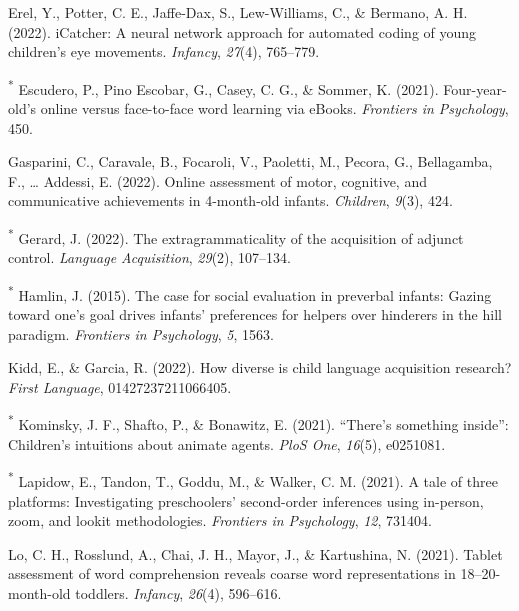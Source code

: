 \documentclass[
  man,floatsintext]{apa6}
\newlength{\cslhangindent}
\newlength{\cslentryspacingunit} %
\newenvironment{CSLReferences}[2] %
 {%
  \setlength{\parindent}{0pt}
  \ifodd #1
  \let\oldpar\par
  \def\par{\hangindent=\cslhangindent\oldpar}
  \fi
  \setlength{\parskip}{#2\cslentryspacingunit}
 }%
 {}
\begin{document}
\begin{CSLReferences}{1}{0}
\leavevmode{}%
Erel, Y., Potter, C. E., Jaffe-Dax, S., Lew-Williams, C., \& Bermano, A. H. (2022). iCatcher: A neural network approach for automated coding of young children's eye movements. \emph{Infancy}, \emph{27}(4), 765--779.

\leavevmode{}%
\textsuperscript{*} Escudero, P., Pino Escobar, G., Casey, C. G., \& Sommer, K. (2021). Four-year-old's online versus face-to-face word learning via eBooks. \emph{Frontiers in Psychology}, 450.

\leavevmode{}%
Gasparini, C., Caravale, B., Focaroli, V., Paoletti, M., Pecora, G., Bellagamba, F., \ldots{} Addessi, E. (2022). Online assessment of motor, cognitive, and communicative achievements in 4-month-old infants. \emph{Children}, \emph{9}(3), 424.

\leavevmode{}%
\textsuperscript{*} Gerard, J. (2022). The extragrammaticality of the acquisition of adjunct control. \emph{Language Acquisition}, \emph{29}(2), 107--134.

\leavevmode{}%
\textsuperscript{*} Hamlin, J. (2015). The case for social evaluation in preverbal infants: Gazing toward one's goal drives infants' preferences for helpers over hinderers in the hill paradigm. \emph{Frontiers in Psychology}, \emph{5}, 1563.

\leavevmode{}%
Kidd, E., \& Garcia, R. (2022). How diverse is child language acquisition research? \emph{First Language}, 01427237211066405.

\leavevmode{}%
\textsuperscript{*} Kominsky, J. F., Shafto, P., \& Bonawitz, E. (2021). {``There's something inside''}: Children's intuitions about animate agents. \emph{PloS One}, \emph{16}(5), e0251081.

\leavevmode{}%
\textsuperscript{*} Lapidow, E., Tandon, T., Goddu, M., \& Walker, C. M. (2021). A tale of three platforms: Investigating preschoolers' second-order inferences using in-person, zoom, and lookit methodologies. \emph{Frontiers in Psychology}, \emph{12}, 731404.

\leavevmode{}%
Lo, C. H., Rosslund, A., Chai, J. H., Mayor, J., \& Kartushina, N. (2021). Tablet assessment of word comprehension reveals coarse word representations in 18--20-month-old toddlers. \emph{Infancy}, \emph{26}(4), 596--616.


\end{CSLReferences}
\end{document}
